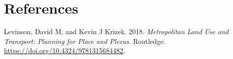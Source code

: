 \documentclass[12pt,]{article}
\begin{document}
\hypertarget{references}{%
\section*{References}\label{references}}

\hypertarget{refs}{}
\leavevmode\hypertarget{ref-levinson2018metropolitan}{}%
Levinson, David M, and Kevin J Krizek. 2018. \emph{Metropolitan Land Use
and Transport: Planning for Place and Plexus}. Routledge.
\url{https://doi.org/10.4324/9781315684482}.
\end{document}

